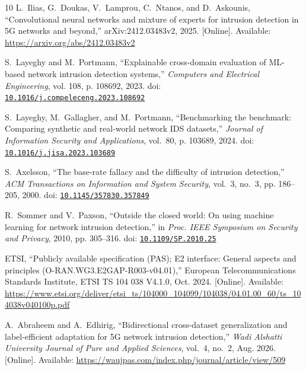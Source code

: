 \begin{thebibliography}{10}
\BIBentryALTinterwordspacing
L.~Ilias, G.~Doukas, V.~Lamprou, C.~Ntanos, and D.~Askounis, ``Convolutional
  neural networks and mixture of experts for intrusion detection in {5G}
  networks and beyond,'' arXiv:2412.03483v2, 2025. [Online]. Available:
  \url{https://arxiv.org/abs/2412.03483v2}
\BIBentrySTDinterwordspacing

S.~Layeghy and M.~Portmann, ``Explainable cross-domain evaluation of {ML}-based
  network intrusion detection systems,'' \emph{Computers and Electrical
  Engineering}, vol. 108, p. 108692, 2023. doi:
  \href{https://doi.org/10.1016/j.compeleceng.2023.108692}{\nolinkurl{10.1016/j.compeleceng.2023.108692}}

S.~Layeghy, M.~Gallagher, and M.~Portmann, ``Benchmarking the benchmark:
  Comparing synthetic and real-world network {IDS} datasets,'' \emph{Journal of
  Information Security and Applications}, vol.~80, p. 103689, 2024. doi:
  \href{https://doi.org/10.1016/j.jisa.2023.103689}{\nolinkurl{10.1016/j.jisa.2023.103689}}

S.~Axelsson, ``The base-rate fallacy and the difficulty of intrusion
  detection,'' \emph{ACM Transactions on Information and System Security},
  vol.~3, no.~3, pp. 186--205, 2000. doi:
  \href{https://doi.org/10.1145/357830.357849}{\nolinkurl{10.1145/357830.357849}}

R.~Sommer and V.~Paxson, ``Outside the closed world: On using machine learning
  for network intrusion detection,'' in \emph{Proc. IEEE Symposium on Security
  and Privacy}, 2010, pp. 305--316. doi:
  \href{https://doi.org/10.1109/SP.2010.25}{\nolinkurl{10.1109/SP.2010.25}}

\BIBentryALTinterwordspacing
{ETSI}, ``Publicly available specification ({PAS}); {E2} interface: General
  aspects and principles ({O-RAN.WG3.E2GAP-R003-v04.01}),'' European
  Telecommunications Standards Institute, ETSI TS 104 038 V4.1.0, Oct. 2024.
  [Online]. Available:
  \url{https://www.etsi.org/deliver/etsi_ts/104000_104099/104038/04.01.00_60/ts_104038v040100p.pdf}
\BIBentrySTDinterwordspacing

\BIBentryALTinterwordspacing
A.~Abraheem and A.~Edhirig, ``Bidirectional cross-dataset generalization and
  label-efficient adaptation for {5G} network intrusion detection,'' \emph{Wadi
  Alshatti University Journal of Pure and Applied Sciences}, vol.~4, no.~2,
  Aug. 2026. [Online]. Available:
  \url{https://waujpas.com/index.php/journal/article/view/509}
\BIBentrySTDinterwordspacing


\end{thebibliography}
